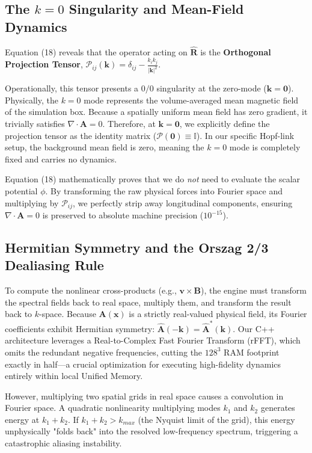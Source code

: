 \documentclass[11pt, a4paper]{article}
\begin{document}
\subsection{The $k=0$ Singularity and Mean-Field Dynamics}
Equation (18) reveals that the operator acting on $\hat{\mathbf{R}}$ is the \textbf{Orthogonal Projection Tensor}, $\mathcal{P}_{ij}(\mathbf{k}) = \delta_{ij} - \frac{k_i k_j}{|\mathbf{k}|^2}$. 

Operationally, this tensor presents a $0/0$ singularity at the zero-mode ($\mathbf{k} = \mathbf{0}$). Physically, the $k=0$ mode represents the volume-averaged mean magnetic field of the simulation box. Because a spatially uniform mean field has zero gradient, it trivially satisfies $\nabla \cdot \mathbf{A} = 0$. Therefore, at $\mathbf{k} = \mathbf{0}$, we explicitly define the projection tensor as the identity matrix ($\mathcal{P}(\mathbf{0}) \equiv \mathbb{I}$). In our specific Hopf-link setup, the background mean field is zero, meaning the $k=0$ mode is completely fixed and carries no dynamics.

Equation (18) mathematically proves that we do \textit{not} need to evaluate the scalar potential $\phi$. By transforming the raw physical forces into Fourier space and multiplying by $\mathcal{P}_{ij}$, we perfectly strip away longitudinal components, ensuring $\nabla \cdot \mathbf{A} = 0$ is preserved to absolute machine precision ($10^{-15}$).

\subsection{Hermitian Symmetry and the Orszag 2/3 Dealiasing Rule}
To compute the nonlinear cross-products (e.g., $\mathbf{v} \times \mathbf{B}$), the engine must transform the spectral fields back to real space, multiply them, and transform the result back to $k$-space. Because $\mathbf{A}(\mathbf{x})$ is a strictly real-valued physical field, its Fourier coefficients exhibit Hermitian symmetry: $\hat{\mathbf{A}}(-\mathbf{k}) = \hat{\mathbf{A}}^*(\mathbf{k})$. Our C++ architecture leverages a Real-to-Complex Fast Fourier Transform (rFFT), which omits the redundant negative frequencies, cutting the $128^3$ RAM footprint exactly in half—a crucial optimization for executing high-fidelity dynamics entirely within local Unified Memory.

However, multiplying two spatial grids in real space causes a convolution in Fourier space. A quadratic nonlinearity multiplying modes $k_1$ and $k_2$ generates energy at $k_1 + k_2$. If $k_1 + k_2 > k_{max}$ (the Nyquist limit of the grid), this energy unphysically "folds back" into the resolved low-frequency spectrum, triggering a catastrophic aliasing instability. 
\end{document}
